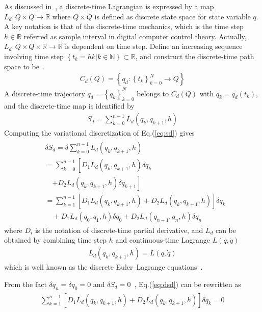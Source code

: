 \documentclass[10pt,onecolumn,draftcls]{IEEEtran}
\begin{document}
As discussed in~\cite{Marsden2001Discrete}, a discrete-time Lagrangian is expressed by a map $L_d:Q\times Q\to \mathbb R$ where $Q\times Q$ is defined as discrete state space for state variable $q$. A key notation is that of the discrete-time mechanics, which is the time step $h\in \mathbb R$ referred as sample interval in digital computer control theory. Actually, $L_d:Q\times Q\times\mathbb R\to \mathbb R$ is dependent on time step. Define an increasing sequence involving time step $\left\{t_k=hk\left\vert k\in\mathbb N\right.\right\}\subset \mathbb R$, and construct the discrete-time path space to be~\cite{Marsden2001Discrete}.
\begin{align}
	C_d(Q)=\left\{q_d:\left\{t_k\right\}^N_{k=0}\to Q\right\}
\end{align}
A discrete-time trajectory $q_d=\left\{q_k\right\}^N_{k=0}$ belongs to $C_d(Q)$ with $q_k=q_d(t_k)$, and the discrete-time map is identified by
\begin{align}\label{eq:sd}
	S_d=\sum^{n-1}_{k=0}L_d(q_k,q_{k+1},h)
\end{align}
Computing the variational discretization of Eq.(\ref{eq:sd}) gives
\begin{align}\begin{split}\label{eq:dsd}
	&\delta S_d=\delta\sum^{n-1}_{k=0}L_d(q_k,q_{k+1},h)\\
	&=\sum^{n-1}_{k=0}\left[D_1L_d(q_k,q_{k+1},h)\delta q_k\right.\\
	&\quad\left.+D_2L_d(q_k,q_{k+1},h)\delta q_{k+1}\right]\\
	&=\sum^{n-1}_{k=1}\left[D_1L_d(q_k,q_{k+1},h)+D_2L_d(q_k,q_{k+1},h)\right]\delta q_{k}\\
		&\quad+D_1L_d(q_0,q_{1},h)\delta q_0+D_2L_d(q_{n-1},q_{n},h)\delta q_n
\end{split}\end{align}
where $D_{i}$ is the notation of discrete-time partial derivative, and $L_d$ can be obtained by combining time step $h$ and continuous-time Lagrange $L(q,\dot q)$~\cite{Marsden2001Discrete}
\begin{align}
	L_d(q_k,q_{k+1},h)=L(q,\dot q)
\end{align}
which is well known as the discrete Euler–Lagrange equations~\cite{Bloch2005Controlled}.

From the fact $\delta q_n=\delta q_0=0$ and $\delta S_d=0$~\cite{Marsden2001Discrete}, Eq.(\ref{eq:dsd}) can be rewritten as
\begin{align}\begin{split}
        \sum^{n-1}_{k=1}\left[D_1L_d(q_k,q_{k+1},h)+D_2L_d(q_k,q_{k+1},h)\right]\delta q_{k}=0
\end{split}\end{align} 
\end{document}
